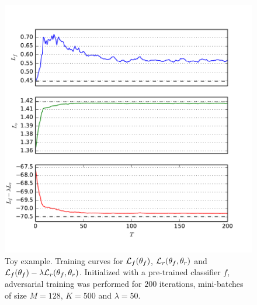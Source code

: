 \documentclass{article}
\theoremstyle{plain}
\begin{document}
\begin{figure}
\centering
\begin{minipage}{.46\linewidth}
    \centering
        \includegraphics[width=\textwidth]{../figures/training.pdf}\vspace{-1em}
        \caption{Toy example. Training curves for ${\cal L}_f(\theta_f)$, ${\cal L}_r(\theta_f, \theta_r)$
                 and ${\cal L}_f(\theta_f) - \lambda {\cal L}_r(\theta_f, \theta_r)$.
                 Initialized with a pre-trained classifier $f$, adversarial training was performed for $200$ iterations, mini-batches of size $M=128$, $K=500$ and $\lambda=50$.}
        \label{fig:toy-training}
\end{minipage}
\hspace{.05\linewidth}
\begin{minipage}{.46\linewidth}
    \centering

\end{minipage}
\end{figure}
\end{document}
